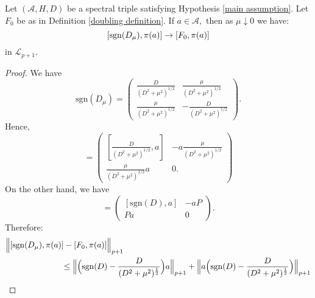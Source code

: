     \begin{lem}\label{first doubling lemma} 
        Let $(\mathcal{A},H,D)$ be a spectral triple satisfying Hypothesis \ref{main assumption}. Let $F_0$ be as in Definition \ref{doubling definition}. If $a\in\mathcal{A},$ then
        as $\mu\downarrow 0$ we have:
        $$[{\rm sgn}(D_{\mu}),\pi(a)]\to[F_0,\pi(a)]$$
        in $\mathcal{L}_{p+1}$.
    \end{lem}
    \begin{proof} 
        We have
        \begin{equation*}
            \mathrm{sgn}(D_{\mu}) = \begin{pmatrix} 
                                            \frac{D}{(D^2+\mu^2)^{1/2}}   & \frac{\mu}{(D^2+\mu^2)^{1/2}} \\ 
                                            \frac{\mu}{(D^2+\mu^2)^{1/2}} & -\frac{D}{(D^2+\mu^2)^{1/2}}
                                    \end{pmatrix}.
        \end{equation*}
    Hence,
    \begin{equation*}
        [\mathrm{sgn}(D_\mu),\pi(a)]  = \begin{pmatrix}
                                            \left[\frac{D}{(D^2+\mu^2)^{1/2}},a\right] & -a\frac{\mu}{(D^2+\mu^2)^{1/2}}\\ \frac{\mu}{(D^2+\mu^2)^{1/2}}a & 0.
                                        \end{pmatrix}
    \end{equation*}
    On the other hand, we have
    \begin{equation*}
        [F_0,\pi(a)] = \begin{pmatrix} 
                          [\mathrm{sgn}(D),a] & -aP\\ Pa & 0
                       \end{pmatrix}.
    \end{equation*}
    Therefore:
    \begin{align*}
        \Big\|[{\rm sgn}(D_{\mu}),\pi(a)&]-[F_0,\pi(a)]\Big\|_{p+1}\\
                                        &\leq \Big\|\Big({\rm sgn}(D)-\frac{D}{(D^2+\mu^2)^{\frac12}}\Big)a\Big\|_{p+1}+\Big\|a\Big({\rm sgn}(D)-\frac{D}{(D^2+\mu^2)^{\frac12}}\Big)\Big\|_{p+1}\\

\end{align*}
\end{proof}
